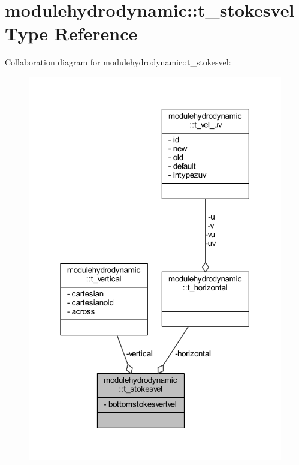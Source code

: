 \hypertarget{structmodulehydrodynamic_1_1t__stokesvel}{}\section{modulehydrodynamic\+:\+:t\+\_\+stokesvel Type Reference}
\label{structmodulehydrodynamic_1_1t__stokesvel}


Collaboration diagram for modulehydrodynamic\+:\+:t\+\_\+stokesvel\+:\nopagebreak
\begin{figure}[H]
\begin{center}
\leavevmode
\includegraphics[width=316pt]{structmodulehydrodynamic_1_1t__stokesvel__coll__graph}
\end{center}
\end{figure}
